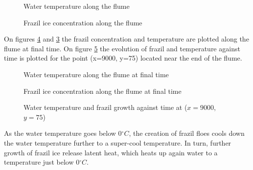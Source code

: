 \begin{figure}[H]
    \begin{center}
    \end{center}
    \caption{Water temperature along the flume}
    \label{fig:growth_temp}
\end{figure}

\begin{figure}[H]
    \begin{center}
    \end{center}
    \caption{Frazil ice concentration along the flume}
    \label{fig:growth_Cf}
\end{figure}

On figures \ref{fig:2d_frazil} and \ref{fig:2d_temperature} the frazil concentration and temperature are plotted along the flume at final time. On figure \ref{fig:growth_Cf_timeseries} the evolution of frazil and temperature against time is plotted for the point
(x=9000, y=75) located near the end of the flume.

\begin{figure}[H]
    \begin{center}
    \end{center}
    \caption{Water temperature along the flume at final time}
    \label{fig:2d_temperature}
\end{figure}


\begin{figure}[H]
    \begin{center}
    \end{center}
    \caption{Frazil ice concentration along the flume at final time}
    \label{fig:2d_frazil}
\end{figure}

\begin{figure}[H]
    \begin{center}
    \end{center}
    \caption{Water temperature and frazil growth against time at ($x=9000$, $y=75$)}
    \label{fig:growth_Cf_timeseries}
\end{figure}

As the water temperature goes below 0$^\circ C$, the creation of frazil floes cools down the water temperature further to a super-cool temperature. In turn, further growth of frazil ice release latent heat, which heats up again water to a temperature just below 0$^\circ C$.

